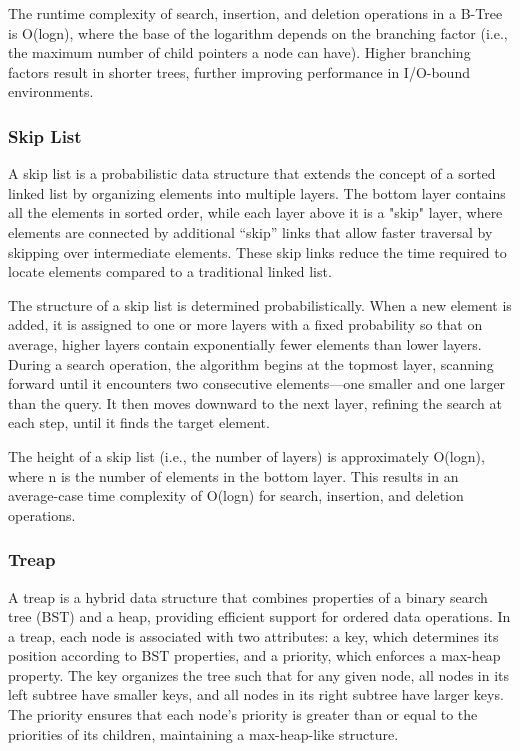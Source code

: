 \documentclass[sigconf]{acmart}
\begin{document}
The runtime complexity of search, insertion, and deletion operations in a B-Tree is O(logn), where the base of the logarithm depends on the branching factor (i.e., the maximum number of child pointers a node can have). Higher branching factors result in shorter trees, further improving performance in I/O-bound environments.

\subsubsection{Skip List}
A skip list is a probabilistic data structure that extends the concept of a sorted linked list by organizing elements into multiple layers. The bottom layer contains all the elements in sorted order, while each layer above it is a "skip" layer, where elements are connected by additional “skip” links that allow faster traversal by skipping over intermediate elements. These skip links reduce the time required to locate elements compared to a traditional linked list.

The structure of a skip list is determined probabilistically. When a new element is added, it is assigned to one or more layers with a fixed probability so that on average, higher layers contain exponentially fewer elements than lower layers. During a search operation, the algorithm begins at the topmost layer, scanning forward until it encounters two consecutive elements—one smaller and one larger than the query. It then moves downward to the next layer, refining the search at each step, until it finds the target element.

The height of a skip list (i.e., the number of layers) is approximately O(logn), where n is the number of elements in the bottom layer. This results in an average-case time complexity of O(logn) for search, insertion, and deletion operations.
\subsubsection{Treap}
A treap is a hybrid data structure that combines properties of a binary search tree (BST) and a heap, providing efficient support for ordered data operations. In a treap, each node is associated with two attributes: a key, which determines its position according to BST properties, and a priority, which enforces a max-heap property. The key organizes the tree such that for any given node, all nodes in its left subtree have smaller keys, and all nodes in its right subtree have larger keys. The priority ensures that each node's priority is greater than or equal to the priorities of its children, maintaining a max-heap-like structure.
\end{document}
